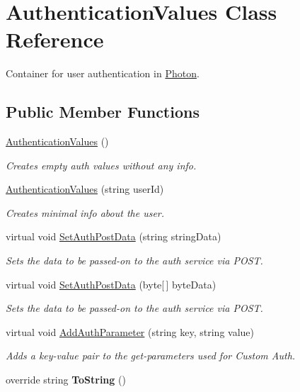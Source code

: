 \hypertarget{class_authentication_values}{}\section{Authentication\+Values Class Reference}
\label{class_authentication_values}


Container for user authentication in \hyperlink{namespace_photon}{Photon}.  


\subsection*{Public Member Functions}
\begin{DoxyCompactItemize}
\item 
\hyperlink{class_authentication_values_a25eb4617207f2cb2f97ecbf91091ed96}{Authentication\+Values} ()
\begin{DoxyCompactList}\small\item\em Creates empty auth values without any info.\end{DoxyCompactList}\item 
\hyperlink{class_authentication_values_a59e9550389ab702b9bc033eeb6e117a2}{Authentication\+Values} (string user\+Id)
\begin{DoxyCompactList}\small\item\em Creates minimal info about the user. \end{DoxyCompactList}\item 
virtual void \hyperlink{class_authentication_values_adac06329a99f2a0035e485e45460d9af}{Set\+Auth\+Post\+Data} (string string\+Data)
\begin{DoxyCompactList}\small\item\em Sets the data to be passed-\/on to the auth service via P\+O\+ST. \end{DoxyCompactList}\item 
virtual void \hyperlink{class_authentication_values_a3fd84b1b6fca86c6838d6c2fff8926e0}{Set\+Auth\+Post\+Data} (byte\mbox{[}$\,$\mbox{]} byte\+Data)
\begin{DoxyCompactList}\small\item\em Sets the data to be passed-\/on to the auth service via P\+O\+ST. \end{DoxyCompactList}\item 
virtual void \hyperlink{class_authentication_values_af800bbd7144b184c244277c37297dba1}{Add\+Auth\+Parameter} (string key, string value)
\begin{DoxyCompactList}\small\item\em Adds a key-\/value pair to the get-\/parameters used for Custom Auth. \end{DoxyCompactList}\item 
override string {\bfseries To\+String} ()\hypertarget{class_authentication_values_af74e9d15a79034c547ea621bb70899b4}{}\label{class_authentication_values_af74e9d15a79034c547ea621bb70899b4}

\end{DoxyCompactItemize}
